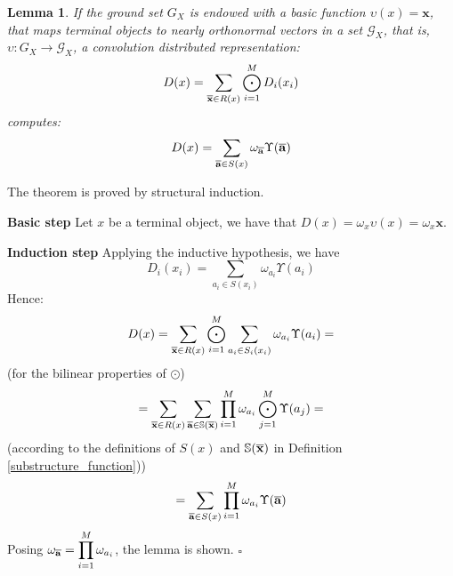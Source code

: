 \documentclass[twoside,11pt]{article}
\newtheorem{lemma}{Lemma}
\newenvironment{proof}{{\bf Proof:}}{$\square$ }
\def\vec#1{\mathbf{#1}}
\def\svec#1{\vec{#1}}
\def\substr#1{{\bf\overline{#1}}}
\def\df{\Upsilon}
\def\basicdf{\upsilon}
\def\mo{\odot}
\def\Mo{\bigodot}
\newcounter{properties}
\begin{document}
\begin{lemma}
\label{d_theorem}
If the ground set $G_X$  is endowed with a basic function $\basicdf(x) = \svec{x}$, that maps terminal objects to nearly orthonormal vectors in a set ${\mathcal G_X}$, that is, $\basicdf: G_X \rightarrow {\mathcal G_X}$, a convolution distributed representation:
\begin{displaymath}
D(x) = \displaystyle\sum_{\substr{x} \in R(x)} \displaystyle\Mo_{i=1}^M D_i(x_i)
\end{displaymath}
computes:
\begin{displaymath}
D(x) = \displaystyle\sum_{\substr{a} \in S(x)}\omega_{\substr{a}}\df(\substr{a}) 
\end{displaymath}
\end{lemma}

\begin{proof}
The theorem is proved by structural induction.

\textbf{Basic step} Let $x$ be a terminal object, we have that $D(x)=\omega_x \basicdf(x) = \omega_x \svec{x}$.

\textbf{Induction step}  Applying the inductive hypothesis, we have\\
\begin{displaymath}
D_i(x_i) = \displaystyle\sum_{a_i \in S(x_i)}\omega_{a_i}\df(a_i) 
\end{displaymath}
Hence:
\begin{displaymath}
D(x) = \displaystyle\sum_{\substr{x} \in R(x)} \displaystyle\Mo_{i=1}^M  \displaystyle\sum_{a_i \in S_i(x_i)}\omega_{a_i}\df(a_i) =
\end{displaymath}
(for the bilinear properties of $\mo$)
\begin{displaymath}
= \displaystyle\sum_{\substr{x} \in R(x)} \displaystyle\sum_{\substr{a} \in {\mathbb S}(\substr{x})}   \displaystyle\prod_{i=1}^M\omega_{a_i} \displaystyle\Mo_{j=1}^M \df(a_j) =
\end{displaymath}
(according to the definitions of $S(x)$ and ${\mathbb S}(\substr{x})$ in Definition \ref{substructure_function}))
\begin{displaymath}
= \displaystyle\sum_{\substr{a} \in S(x)}  \displaystyle\prod_{i=1}^{M}\omega_{a_i}  \df(\substr a) 
\end{displaymath}
Posing $\omega_{\substr a} = \displaystyle\prod_{i=1}^{M}\omega_{a_i}$, the lemma is shown. 
\end{proof}
\end{document}
